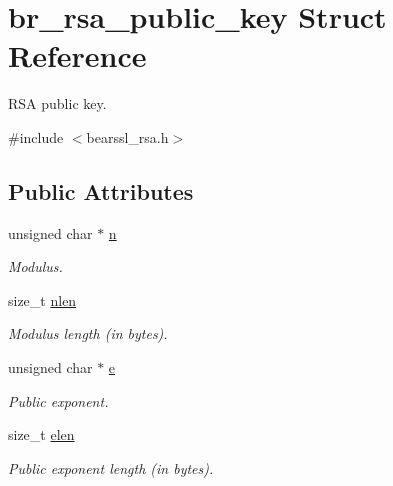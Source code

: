\hypertarget{structbr__rsa__public__key}{}\section{br\+\_\+rsa\+\_\+public\+\_\+key Struct Reference}
\label{structbr__rsa__public__key}


R\+SA public key.  




{\ttfamily \#include $<$bearssl\+\_\+rsa.\+h$>$}

\subsection*{Public Attributes}
\begin{DoxyCompactItemize}
\item 
\mbox{\label{structbr__rsa__public__key_a3d73ffff37329e2e1c9efdae8ddfa53f}} 
unsigned char $\ast$ \hyperlink{structbr__rsa__public__key_a3d73ffff37329e2e1c9efdae8ddfa53f}{n}
\begin{DoxyCompactList}\small\item\em Modulus. \end{DoxyCompactList}\item 
\mbox{\label{structbr__rsa__public__key_acae4c476eba789845538804d565d3f55}} 
size\+\_\+t \hyperlink{structbr__rsa__public__key_acae4c476eba789845538804d565d3f55}{nlen}
\begin{DoxyCompactList}\small\item\em Modulus length (in bytes). \end{DoxyCompactList}\item 
\mbox{\label{structbr__rsa__public__key_acc109cf04cf03328927471bae376731c}} 
unsigned char $\ast$ \hyperlink{structbr__rsa__public__key_acc109cf04cf03328927471bae376731c}{e}
\begin{DoxyCompactList}\small\item\em Public exponent. \end{DoxyCompactList}\item 
\mbox{\label{structbr__rsa__public__key_a25c48aea2fbaf14e669dc9cf1827cbc9}} 
size\+\_\+t \hyperlink{structbr__rsa__public__key_a25c48aea2fbaf14e669dc9cf1827cbc9}{elen}
\begin{DoxyCompactList}\small\item\em Public exponent length (in bytes). \end{DoxyCompactList}\end{DoxyCompactItemize}


